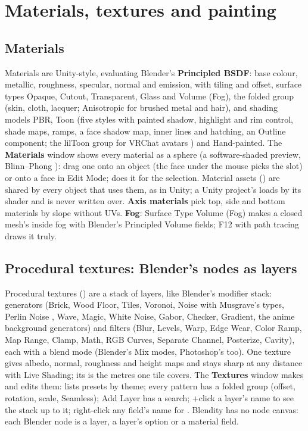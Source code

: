 \chapter{Materials, textures and painting}
\label{ch:surface}

\section{Materials}
Materials are Unity-style, evaluating Blender's \textbf{Principled BSDF}: base colour, metallic, roughness, specular,
normal and emission, with tiling and offset, surface types Opaque, Cutout, Transparent, Glass and Volume (Fog), the
folded  group (skin, cloth, lacquer; Anisotropic for brushed metal and hair), and
shading models PBR, Toon (five styles with painted shadow, highlight and rim control, shade maps, ramps, a face shadow
map, inner lines and hatching, an Outline component; the lilToon group for VRChat avatars \cite{lilToon2026}) and
Hand-painted. The \textbf{Materials} window shows every material as a sphere (a software-shaded preview, Blinn--Phong
\cite{Phong1975}): drag one onto an object (the face under
the mouse picks the slot) or onto a face in Edit Mode;  does it for the selection. Material
assets () are shared by every object that uses them, as in Unity; a Unity project's
 loads by its shader and is never written over. \textbf{Axis materials} pick top, side and bottom materials by
slope without UVs. \textbf{Fog}: Surface Type Volume (Fog) makes a closed mesh's inside fog with Blender's Principled
Volume fields; F12 with path tracing draws it truly.

\section{Procedural textures: Blender's nodes as layers}
Procedural textures () are a stack of layers, like Blender's modifier stack:
generators (Brick, Wood Floor, Tiles, Voronoi, Noise with Musgrave's types, Perlin Noise \cite{Perlin2002Improving},
Wave, Magic, White Noise, Gabor, Checker, Gradient, the anime background generators) and filters (Blur, Levels, Warp,
Edge Wear, Color Ramp, Map Range, Clamp, Math, RGB Curves, Separate Channel, Posterize, Cavity), each with a blend
mode (Blender's Mix modes, Photoshop's too). One texture gives albedo, normal, roughness and height maps and stays
sharp at any distance with Live Shading; its  is the metres one tile covers. The \textbf{Textures}
window makes and edits them:  lists presets by theme; every pattern has a folded  group (offset,
rotation, scale, Seamless); Add Layer has a search; +click a layer's name to see the stack up to it;
right-click any field's name for . Blendity has no node canvas: each Blender node is a layer, a
layer's option or a material field.

